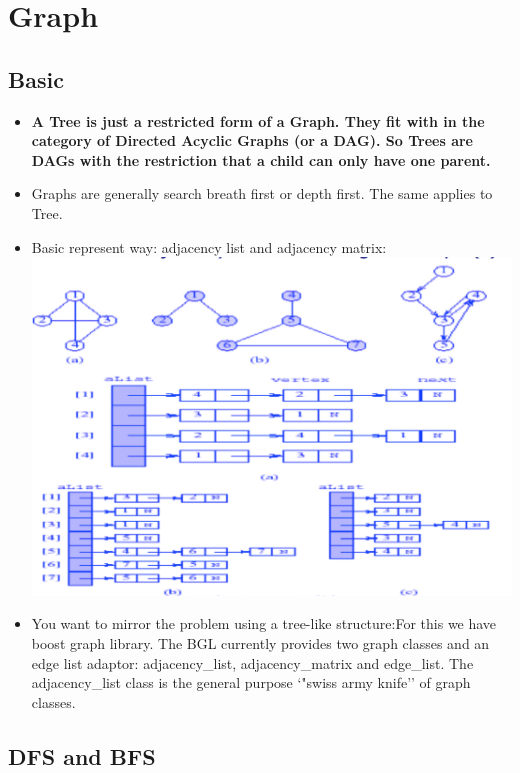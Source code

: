 \documentclass[a4paper,12pt,twoside]{book}
\begin{document}
\section{Graph}
\subsection{Basic}
\begin{itemize}
\item \textbf{A Tree is just a restricted form of a Graph. They fit with in the category of Directed Acyclic Graphs (or a DAG). So Trees are DAGs with the restriction that a child can only have one parent.}

\item Graphs are generally search breath first or depth first. The same applies to Tree.

\item Basic represent way: adjacency list and adjacency matrix: \newline
\includegraphics[scale=0.6]{pics/adjacency.png} \newline

\item You want to mirror the problem using a tree-like structure:For this we have boost graph library. The BGL currently provides two graph classes and an edge list adaptor: adjacency\_list, adjacency\_matrix and edge\_list.  The adjacency\_list class is the general purpose `"swiss army knife'' of graph classes.
\end{itemize}

\subsection{DFS and BFS}
\end{document}
